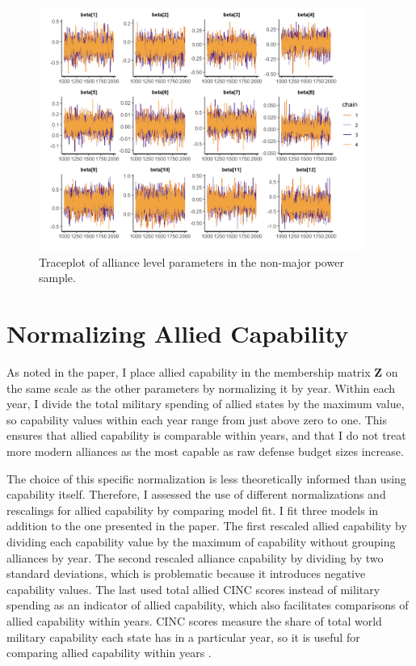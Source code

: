 \documentclass[12pt]{article}
\begin{document}
\begin{figure}[htbp]
	\centering
		\includegraphics[width=0.95\textwidth]{trace-all-min.png}
	\caption{Traceplot of alliance level parameters in the non-major power sample.}
	\label{fig:trace-all-min}
\end{figure}



\section*{Normalizing Allied Capability}

As noted in the paper, I place allied capability in the membership matrix \textbf{Z} on the same scale as the other parameters by normalizing it by year. 
Within each year, I divide the total military spending of allied states by the maximum value, so capability values within each year range from just above zero to one. 
This ensures that allied capability is comparable within years, and that I do not treat more modern alliances as the most capable as raw defense budget sizes increase. 


The choice of this specific normalization is less theoretically informed than using capability itself. 
Therefore, I assessed the use of different normalizations and rescalings for allied capability by comparing model fit. 
I fit three models in addition to the one presented in the paper. 
The first rescaled allied capability by dividing each capability value by the maximum of capability without grouping alliances by year. 
The second rescaled alliance capability by dividing by two standard deviations, which is problematic because it introduces negative capability values. 
The last used total allied CINC scores instead of military spending as an indicator of allied capability, which also facilitates comparisons of allied capability within years. 
CINC scores measure the share of total world military capability each state has in a particular year, so it is useful for comparing allied capability within years \citep{SingerCINC1988}. 
\end{document}
